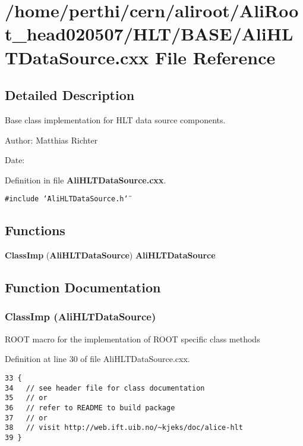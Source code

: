 \section{/home/perthi/cern/aliroot/Ali\-Root\_\-head020507/HLT/BASE/Ali\-HLTData\-Source.cxx File Reference}
\label{AliHLTDataSource_8cxx}


\subsection{Detailed Description}
Base class implementation for HLT data source components. 

\begin{Desc}
\item[Author:]Matthias Richter \end{Desc}
\begin{Desc}
\item[Date:]\end{Desc}


Definition in file {\bf Ali\-HLTData\-Source.cxx}.

{\tt \#include \char`\"{}Ali\-HLTData\-Source.h\char`\"{}}\par
\subsection*{Functions}
\begin{CompactItemize}
\item 
{\bf Class\-Imp} ({\bf Ali\-HLTData\-Source}) {\bf Ali\-HLTData\-Source}
\end{CompactItemize}


\subsection{Function Documentation}
\subsubsection{\setlength{\rightskip}{0pt plus 5cm}Class\-Imp ({\bf Ali\-HLTData\-Source})}\label{AliHLTDataSource_8cxx_a0}


ROOT macro for the implementation of ROOT specific class methods 

Definition at line 30 of file Ali\-HLTData\-Source.cxx.

\footnotesize\begin{verbatim}33 { 
34   // see header file for class documentation
35   // or
36   // refer to README to build package
37   // or
38   // visit http://web.ift.uib.no/~kjeks/doc/alice-hlt
39 }
\end{verbatim}\normalsize 


